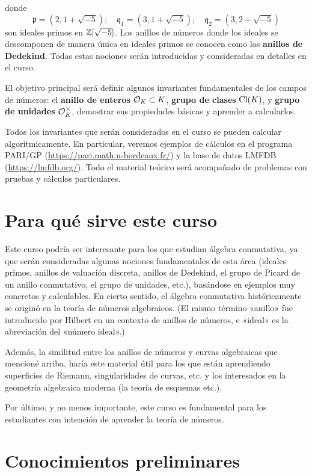 donde
\[ \mathfrak{p} = (2, 1 + \sqrt{-5}); \quad
   \mathfrak{q}_1 = (3, 1 + \sqrt{-5}); \quad
   \mathfrak{q}_2 = (3, 2 + \sqrt{-5}) \]
son ideales primos en $\mathbb{Z} [\sqrt{-5}]$. Los anillos de números donde los
ideales se descomponen de manera única en ideales primos se conocen como
los \textbf{anillos de Dedekind}. Todas estas nociones serán introducidas y
consideradas en detalles en el curso.

El objetivo principal será definir algunos invariantes fundamentales de los
campos de números: el \textbf{anillo de enteros} $\mathcal{O}_K \subset K$,
\textbf{grupo de clases} $\operatorname{Cl} (K)$, y \textbf{grupo de unidades}
$\mathcal{O}_K^\times$, demostrar sus propiedades básicas y aprender a
calcularlos.

Todos los invariantes que serán considerados en el curso se pueden calcular
algorítmicamente. En particular, veremos ejemplos de cálculos en el programa
PARI/GP (\url{https://pari.math.u-bordeaux.fr/}) y la base de datos LMFDB
(\url{https://lmfdb.org/}). Todo el material teórico será acompañado de
problemas con pruebas y cálculos particulares.

\section{Para qué sirve este curso}

Este curso podría ser interesante para los que estudian álgebra conmutativa,
ya que serán consideradas algunas nociones fundamentales de esta área (ideales
primos, anillos de valuación discreta, anillos de Dedekind, el grupo de Picard
de un anillo conmutativo, el grupo de unidades, etc.), basándose en ejemplos muy
concretos y calculables. En cierto sentido, el álgebra conmutativa
históricamente se originó en la teoría de números algebraicos. (El mismo término
«anillo» fue introducido por Hilbert en un contexto de anillos de números,
e «ideal» es la abreviación del «número ideal».)

Además, la similitud entre los anillos de números y curvas algebraicas que
mencioné arriba, haría este material útil para los que están aprendiendo
superficies de Riemann, singularidades de curvas, etc. y los interesados
en la geometría algebraica moderna (la teoría de esquemas etc.).

Por último, y no menos importante, este curso es fundamental para los
estudiantes con intención de aprender la teoría de números.

\section{Conocimientos preliminares}

